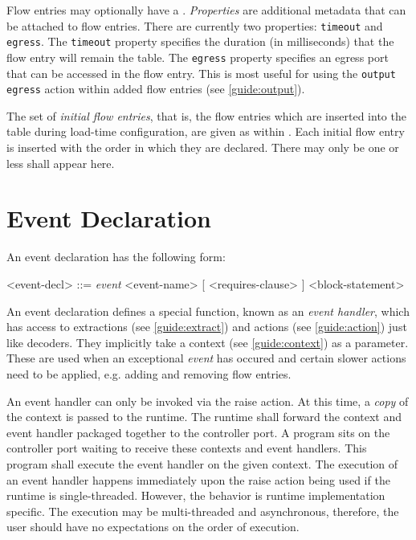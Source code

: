 Flow entries may optionally have a . \textit{Properties} are additional metadata that can be attached to flow entries. There are currently two properties: \texttt{timeout} and \texttt{egress}. The \texttt{timeout} property specifies the duration (in milliseconds) that the flow entry will remain the table. The \texttt{egress} property specifies an egress port that can be accessed in the flow entry. This is most useful for using the \texttt{output egress} action within added flow entries (see \ref{guide:output}).

The set of \textit{initial flow entries}, that is, the flow entries which are inserted into the table during load-time configuration, are given as  within . Each initial flow entry is inserted with the order in which they are declared. There may only be one or less  shall appear here.

\section{Event Declaration} \label{guide:event}

An event declaration has the following form:

\begin{minip}
\begin{grammar}
<event-decl> ::=
\textit{event} <event-name> [ <requires-clause> ]
<block-statement>
\end{grammar}
\end{minip}

An event declaration defines a special function, known as an \textit{event handler}, which has access to extractions (see \ref{guide:extract}) and actions (see \ref{guide:action}) just like decoders. They implicitly take a context (see \ref{guide:context}) as a parameter. These are used when an exceptional \textit{event} has occured and certain slower actions need to be applied, e.g. adding and removing flow entries.

An event handler can only be invoked via the raise action. At this time, a \textit{copy} of the context is passed to the runtime. The runtime shall forward the context and event handler packaged together to the controller port. A program sits on the controller port waiting to receive these contexts and event handlers. This program shall execute the event handler on the given context. The execution of an event handler happens immediately upon the raise action being used if the runtime is single-threaded. However, the behavior is runtime implementation specific. The execution may be multi-threaded and asynchronous, therefore, the user should have no expectations on the order of execution. 

